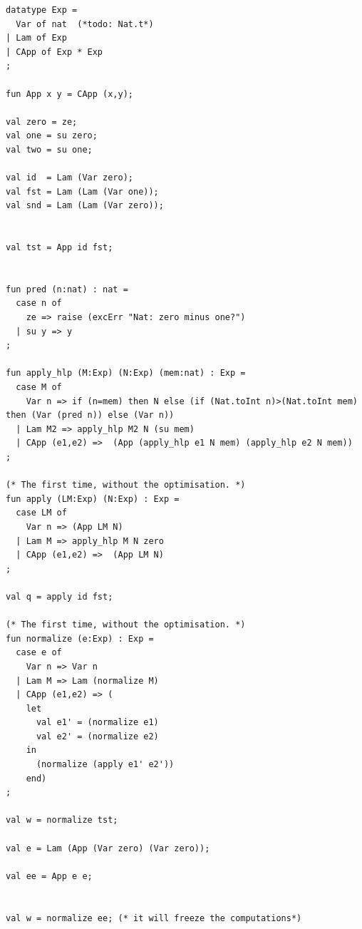 \begin{nolinenumbers}
\begin{lstlisting}
datatype Exp = 
  Var of nat  (*todo: Nat.t*)
| Lam of Exp
| CApp of Exp * Exp
;

fun App x y = CApp (x,y);

val zero = ze;
val one = su zero;
val two = su one;

val id  = Lam (Var zero);
val fst = Lam (Lam (Var one));
val snd = Lam (Lam (Var zero));


val tst = App id fst;


fun pred (n:nat) : nat =
  case n of
    ze => raise (excErr "Nat: zero minus one?")
  | su y => y
;

fun apply_hlp (M:Exp) (N:Exp) (mem:nat) : Exp =
  case M of
    Var n => if (n=mem) then N else (if (Nat.toInt n)>(Nat.toInt mem) then (Var (pred n)) else (Var n))
  | Lam M2 => apply_hlp M2 N (su mem)
  | CApp (e1,e2) =>  (App (apply_hlp e1 N mem) (apply_hlp e2 N mem))
;

(* The first time, without the optimisation. *)
fun apply (LM:Exp) (N:Exp) : Exp =
  case LM of
    Var n => (App LM N)
  | Lam M => apply_hlp M N zero
  | CApp (e1,e2) =>  (App LM N)
;

val q = apply id fst;

(* The first time, without the optimisation. *)
fun normalize (e:Exp) : Exp = 
  case e of
    Var n => Var n
  | Lam M => Lam (normalize M)
  | CApp (e1,e2) => (
    let 
      val e1' = (normalize e1)
      val e2' = (normalize e2)
    in
      (normalize (apply e1' e2'))
    end) 
;

val w = normalize tst;

val e = Lam (App (Var zero) (Var zero));

val ee = App e e;


val w = normalize ee; (* it will freeze the computations*)

\end{lstlisting}
\end{nolinenumbers}
\pagebreak


\pagebreak

\pagebreak

\pagebreak

\pagebreak

\pagebreak

\pagebreak

\pagebreak

\pagebreak

\pagebreak
%
%

\pagebreak

